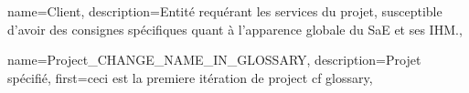 {
    name={Client},
    description={Entité requérant les services du projet, susceptible d'avoir des consignes
            spécifiques quant à l'apparence globale du SaE et ses IHM.},
}

{
    name={Project\_CHANGE\_NAME\_IN\_GLOSSARY},
    description={Projet spécifié},
    first={ceci est la premiere itération de project cf glossary},
}